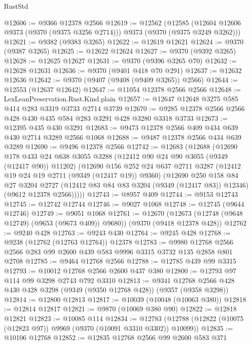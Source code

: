 \begin{lexlean}{RustStd}
\begin{coremodule}
@12606 := @9366 @12378 @2566
@12619 := @12562
    (@12585 (@12604 @12606 @9373 (@9370 (@9375 @3256 @2714))) @9373 (@9370 (@9375 @3249 @3262)))
@12621 := @9382 (@9383 @3265)
@12622 := @12619 @12621
@12624 := @9370 (@9387 @3265)
@12625 := @12622 @12624
@12627 := @9370 (@9392 @3265)
@12628 := @12625 @12627
@12631 := @9370 (@9396 @3265 @70)
@12632 := @12628 @12631
@12636 := @9370 (@9401 @418 @70 @291)
@12637 := @12632 @12636
@12642 := @9370 (@9407 (@9408 (@9409 @3265)) @2566)
@12644 := @12553 (@12637 @12642)
@12647 := @11054 @12378 @2566 @2566
@12648 := LexLeanPreservation.Rust.Kind.plain
@12657 := @12647 @12648 @3275 @585 @414 @283 @3319 @3733 @2714 @3739
@12670 := @9285 @12378 @2566 @2566 @428 @430 @435 @584 @283 @3291 @428 @3280 @3318 @3733
@12673 := @12395 @435 @430 @3291
@12683 := @9473 @12378 @2566 @409 @434 @639 @430 @2714 @3289 @2566 @1068
@12688 := @9487 @12378 @2566 @434 @639 @3289
@12690 := @9496 @12378 @2566
@12742 := @12683
    (@12688
      (@12690
        @178
        @433
        @24
        @638
        @3055
        @3288
        (@12412 @90 @24 @90 @3055 (@9349 (@12417 @90)) @11202)
        (@12690
          @156
          @252
          @24
          @637
          @2711
          @3287
          (@12412 @19 @24 @19 @2711 (@9349 (@12417 @19)) @9360)
          (@12690
            @250
            @158
            @84
            @27
            @3204
            @2727
            (@12412 @83 @84 @83 @3204 (@9349 (@12417 @83)) @12346)
            (@9612 @12378 @2566)))))
@12743 := @8957 @409
@12744 := @9153 @12743
@12745 := @12742 @12744
@12746 := @9027 @1068
@12748 := @12745 (@9644 @12746)
@12749 := @9051 @1068
@12761 := @12670
    (@12673 (@12748 (@9648 @12749) (@9653 (@9673 @409)) @9680))
    (@9370 (@9418 @12378 @428))
@12762 := @9240 @428
@12763 := @9243 @430
@12764 := @9245 @428
@12768 := @9238 (@12762 (@12763 @12764)) @12378
@12783 := @9980 @12768 @2566 @2566 @283 @99 @2600 @439 @583 @9996 @3315 @3732 @135 @2858 @801 @2708
@12785 := @9464 @12768 @2566
@12788 := @12785 @439 @99 @3315
@12793 := @10012 @12768 @2566 @2600 @437 @380
@12800 := @12793 @97 @114 @99 @3298 @2743 @792 @3310
@12813 := @9341 @12768 @2566 @428 @430 @428 @3298 (@9349 (@9350 @12768 @428)) (@9357 (@9358 @3298))
@12814 := @12800 @12813
@12817 := @10039 (@10048 (@10063 @380))
@12818 := @12814 @12817
@12821 := @9870 (@10069 @380 @90)
@12822 := @12818 @12821
@12823 := @10085 @114
@12834 := @12783 (@12788 (@12822 (@10075 (@12823 @97)) @9969 (@9370 (@10091 @3310 @3302)) @10099))
@12835 := @10106 @12768
@12852 := @12835
    @12768
    @2566
    @99
    @2600
    @583
    @371

\end{coremodule}
\end{lexlean}
